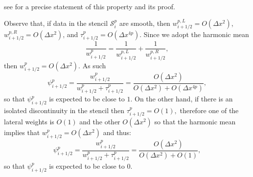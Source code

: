 see  \cite{CPZMR2020} for a precise statement of this property and its proof. 
\begin{rem}
Observe that, if data in the stencil $\mathcal{S}^p_i$ are smooth, then
$w_{i + 1/2}^{p,L} = O(\Delta x^2)$, 
$w_{i + 1/2}^{p,R} = O(\Delta x^2)$, and 
$\tau_{i + 1/2}^p = O(\Delta x^{4p})$.
Since we adopt the harmonic mean
\[
    \frac{1}{w_{i + 1/2}^p} = \frac{1}{w_{i + 1/2}^{p,L}} + \frac{1}{w_{i + 1/2}^{p,R}},
\]
then $w_{i + 1/2}^p = O(\Delta x^2)$. 
As such
\[
    \psi_{i+1/2}^p =  \frac{w_{i + 1/2}^p}{w_{i + 1/2}^p+\tau_{i + 1/2}^p} =  \frac{O(\Delta x^2)}{O(\Delta x^2)+ O(\Delta x^{4p})},
\]
so that $\psi_{i+1/2}^p$ is expected to be close to $1$. 
On the other hand, if there is an isolated discontinuity in the stencil then 
$
\tau_{i + 1/2}^p = O(1),
$
therefore one of the lateral weights is $O(1)$ and the other $O(\Delta x^2)$ so that the harmonic mean implies that  $w_{i + 1/2}^p = O(\Delta x^2)$ and thus:
\[
    \psi_{i+1/2}^p =  \frac{w_{i + 1/2}^p}{w_{i + 1/2}^p+\tau_{i + 1/2}^p}  =  \frac{O(\Delta x^2)}{O(\Delta x^2)+ O(1)}, 
\]
so that $\psi_{i+1/2}^p$ is expected to be close to 0. 
\end{rem}

